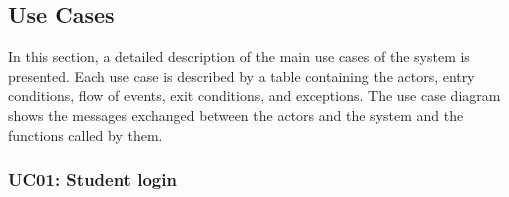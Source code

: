 \subsection{Use Cases}
\label{subsec:use-cases}

\par In this section, a detailed description of the main use cases of the system is presented.
Each use case is described by a table containing the actors, entry conditions, flow of events, exit conditions, and exceptions.
The use case diagram shows the messages exchanged between the actors and the system and the functions called by them.


\subsubsection{UC01: Student login}
\label{subsubsec:student-login}
